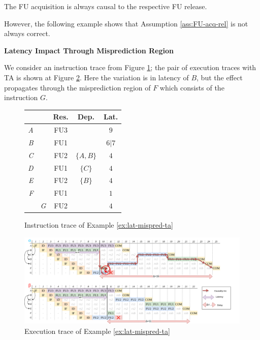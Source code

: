 
\begin{assumption}
The FU acquisition is always causal to the respective FU release.
\label{ass:FU-acq-rel}
\end{assumption}

However, the following example shows that Assumption \ref{ass:FU-acq-rel} is not always correct. 

\begin{example}
\textbf{Latency Impact Through Misprediction Region}

We consider an instruction trace from Figure \ref{fig:lat-mispred-ta-input}; the pair of execution traces with TA is shown at Figure \ref{fig:lat-mispred-ta-trace}. Here the variation is in latency of $B$, but the effect propagates through the misprediction region of $F$ which consists of the instruction $G$. 
\label{ex:lat-mispred-ta}
\end{example}


\begin{figure}[H]
    \centering
    \begin{tabular}{rr|ccc}
    &  & Res. & Dep. & Lat. \\ \hline
    \textit{A} &  & FU3 &  & $9$ \\
    \textit{B} &  & FU1 &  & $6|7$ \\
    \textit{C} &  & FU2 & $\{A, B\}$ & $4$ \\
    \textit{D} &  & FU1 & $\{C\}$ & $4$ \\
    \textit{E} &  & FU2 & $\{B\}$ & $4$ \\
    \textit{F} &  & FU1 &  & $1$ \\
    & \textit{G} & FU2 &  & $4$ \\
    \end{tabular}
    \caption{Instruction trace of Example \ref{ex:lat-mispred-ta}}
    \label{fig:lat-mispred-ta-input}
\end{figure}


\begin{figure}[H]
    \centering
    \includegraphics[width=\textwidth]{figures/lat-mispred.png}
    \caption{Execution trace of Example \ref{ex:lat-mispred-ta}}
    \label{fig:lat-mispred-ta-trace}
\end{figure}


